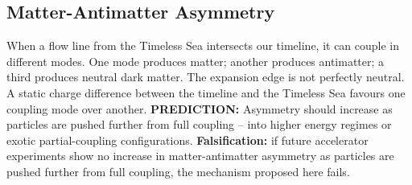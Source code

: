 \documentclass[11pt,a4paper]{article}
\begin{document}
\subsection{Matter-Antimatter Asymmetry}
When a flow line from the Timeless Sea intersects our timeline, it can couple in different modes. One mode produces matter; another produces antimatter; a third produces neutral dark matter. The expansion edge is not perfectly neutral. A static charge difference between the timeline and the Timeless Sea favours one coupling mode over another. \textbf{PREDICTION:} Asymmetry should increase as particles are pushed further from full coupling -- into higher energy regimes or exotic partial-coupling configurations. \textbf{Falsification:} if future accelerator experiments show no increase in matter-antimatter asymmetry as particles are pushed further from full coupling, the mechanism proposed here fails.
\end{document}
